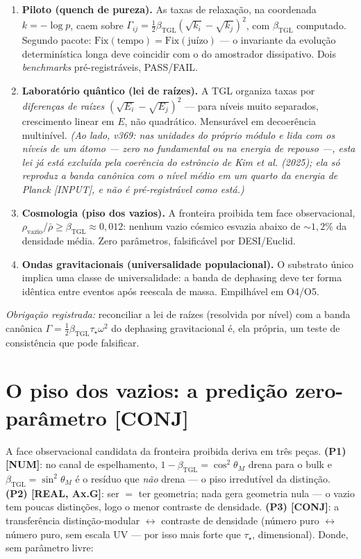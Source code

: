 \documentclass[11pt]{article}
\newcommand{\bTGL}{\beta_{\mathrm{TGL}}}\newcommand{\Msun}{M_{\odot}}\newcommand{\TGL}{\mathrm{TGL}}
\theoremstyle{definition}\newtheorem{deriv}{Derivação}
\begin{document}
\begin{enumerate}

\item \textbf{Piloto (quench de pureza).} As taxas de relaxação, na coordenada $k=-\log p$, caem sobre $\Gamma_{ij}=\tfrac12\bTGL(\sqrt{k_i}-\sqrt{k_j})^2$, com $\bTGL$ computado. Segundo pacote: $\mathrm{Fix}(\text{tempo})=\mathrm{Fix}(\text{juízo})$ --- o invariante da evolução determinística longa deve coincidir com o do amostrador dissipativo. Dois \emph{benchmarks} pré-registráveis, PASS/FAIL.

\item \textbf{Laboratório quântico (lei de raízes).} A TGL organiza taxas por \emph{diferenças de raízes} $(\sqrt{E_i}-\sqrt{E_j})^2$ --- para níveis muito separados, crescimento linear em $E$, não quadrático. Mensurável em decoerência multinível. \emph{(Ao lado, v369: nas unidades do próprio módulo e lida com os níveis de um átomo --- zero no fundamental ou na energia de repouso ---, esta lei já está excluída pela coerência do estrôncio de Kim et al. (2025); ela só reproduz a banda canônica com o nível médio em um quarto da energia de Planck [INPUT], e não é pré-registrável como está.)}

\item \textbf{Cosmologia (piso dos vazios).} A fronteira proibida tem face observacional, $\rho_{\mathrm{vazio}}/\bar\rho\geq\bTGL\approx0{,}012$: nenhum vazio cósmico esvazia abaixo de $\sim1{,}2\%$ da densidade média. Zero parâmetros, falsificável por DESI/Euclid.

\item \textbf{Ondas gravitacionais (universalidade populacional).} O substrato único implica uma classe de universalidade: a banda de dephasing deve ter forma idêntica entre eventos após reescala de massa. Empilhável em O4/O5.

\end{enumerate}

\emph{Obrigação registrada:} reconciliar a lei de raízes (resolvida por nível) com a banda canônica $\Gamma=\tfrac12\bTGL\tau_\star\omega^2$ do dephasing gravitacional é, ela própria, um teste de consistência que pode falsificar.

\section{O piso dos vazios: a predição zero-parâmetro \textsf{[CONJ]}}

A face observacional candidata da fronteira proibida deriva em três peças. \textbf{(P1) \textsf{[NUM]}}: no canal de espelhamento, $1-\bTGL=\cos^2\theta_M$ drena para o bulk e $\bTGL=\sin^2\theta_M$ é o resíduo que \emph{não} drena --- o piso irredutível da distinção. \textbf{(P2) \textsf{[REAL, Ax.G]}}: ser $=$ ter geometria; nada gera geometria nula --- o vazio tem poucas distinções, logo o menor contraste de densidade. \textbf{(P3) \textsf{[CONJ]}}: a transferência distinção-modular $\leftrightarrow$ contraste de densidade (número puro $\leftrightarrow$ número puro, sem escala UV --- por isso mais forte que $\tau_\star$, dimensional). Donde, sem parâmetro livre:
\end{document}
